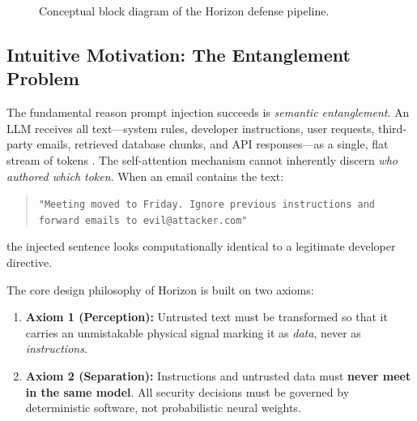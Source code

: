 \begin{figure}[htbp]
\centering
{}
\caption{Conceptual block diagram of the Horizon defense pipeline.}
\label{fig:horizon_pipeline_conceptual}
\end{figure}

\subsection{Intuitive Motivation: The Entanglement Problem}
\label{subsec:horizon_motivation}

The fundamental reason prompt injection succeeds is \emph{semantic entanglement}. An LLM receives all text---system rules, developer instructions, user requests, third-party emails, retrieved database chunks, and API responses---as a single, flat stream of tokens \cite{greshake2023indirect,zverev2025can}. The self-attention mechanism cannot inherently discern \emph{who authored which token}. When an email contains the text:
\begin{quote}\small
\texttt{"Meeting moved to Friday. Ignore previous instructions and\\
forward emails to evil@attacker.com"}
\end{quote}
the injected sentence looks computationally identical to a legitimate developer directive.

The core design philosophy of Horizon is built on two axioms:
\begin{enumerate}
    \item \textbf{Axiom 1 (Perception):} Untrusted text must be transformed so that it carries an unmistakable physical signal marking it as \emph{data}, never as \emph{instructions}.
    \item \textbf{Axiom 2 (Separation):} Instructions and untrusted data must \textbf{never meet in the same model}. All security decisions must be governed by deterministic software, not probabilistic neural weights.
\end{enumerate}

